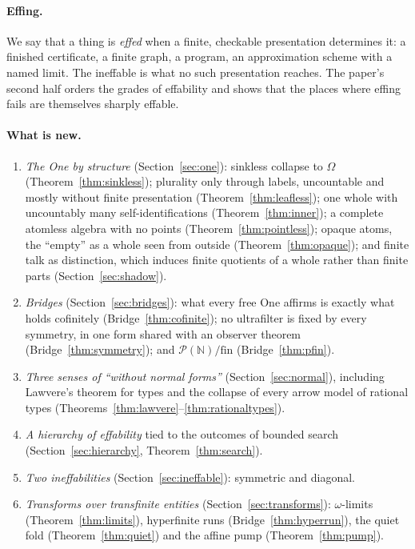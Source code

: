\documentclass[]{article}
\theoremstyle{definition}
\theoremstyle{remark}
\newcommand{\N}{\mathbb{N}}
\newcommand{\Om}{\Omega}
\newcommand{\Pfin}{\mathcal{P}(\N)/\mathrm{fin}}
\begin{document}
\paragraph{Effing.} We say that a thing is \emph{effed} when a finite, checkable presentation
determines it: a finished certificate, a finite graph, a program, an approximation scheme with a
named limit. The ineffable is what no such presentation reaches. The paper's second half orders the
grades of effability and shows that the places where effing fails are themselves sharply effable.

\paragraph{What is new.}
\begin{enumerate}
\item \emph{The One by structure} (Section~\ref{sec:one}): sinkless collapse to $\Om$
  (Theorem~\ref{thm:sinkless}); plurality only through labels, uncountable and mostly without
  finite presentation (Theorem~\ref{thm:leafless}); one whole with uncountably many
  self-identifications (Theorem~\ref{thm:inner}); a complete atomless algebra with no points
  (Theorem~\ref{thm:pointless}); opaque atoms, the ``empty'' as a whole seen from outside
  (Theorem~\ref{thm:opaque}); and finite talk as distinction, which induces finite quotients of a
  whole rather than finite parts (Section~\ref{sec:shadow}).
\item \emph{Bridges} (Section~\ref{sec:bridges}): what every free One affirms is exactly what
  holds cofinitely (Bridge~\ref{thm:cofinite}); no ultrafilter is fixed by every symmetry, in one
  form shared with an observer theorem (Bridge~\ref{thm:symmetry}); and $\Pfin$
  (Bridge~\ref{thm:pfin}).
\item \emph{Three senses of ``without normal forms''} (Section~\ref{sec:normal}), including
  Lawvere's theorem for types and the collapse of every arrow model of rational types
  (Theorems~\ref{thm:lawvere}--\ref{thm:rationaltypes}).
\item \emph{A hierarchy of effability} tied to the outcomes of bounded search
  (Section~\ref{sec:hierarchy}, Theorem~\ref{thm:search}).
\item \emph{Two ineffabilities} (Section~\ref{sec:ineffable}): symmetric and diagonal.
\item \emph{Transforms over transfinite entities} (Section~\ref{sec:transforms}): $\omega$-limits
  (Theorem~\ref{thm:limits}), hyperfinite runs (Bridge~\ref{thm:hyperrun}), the quiet fold
  (Theorem~\ref{thm:quiet}) and the affine pump (Theorem~\ref{thm:pump}).
\end{enumerate}
\end{document}
